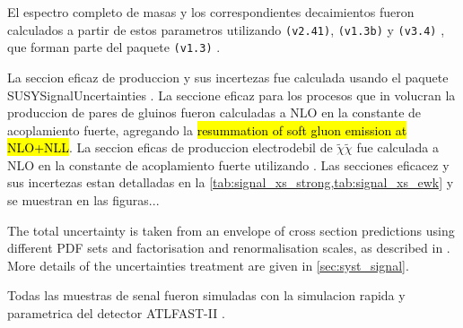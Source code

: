 El espectro completo de masas y los correspondientes decaimientos fueron calculados a partir
de estos parametros utilizando {\suspect} \texttt{(v2.41)}\cite{Djouadi2007426}, {\sdecay} \texttt{(v1.3b)} \cite{Muhlleitner:2004mka}
y {\hdecay} \texttt{(v3.4)} \cite{Djouadi:1997yw}, que forman parte del paquete {\susyhit} \texttt{(v1.3)} \cite{Djouadi:2006bz}.

La seccion eficaz de produccion y sus incertezas fue calculada usando el paquete SUSYSignalUncertainties \cite{SUSYsigunc}.
La seccione eficaz para los procesos que in volucran la produccion de pares de gluinos fueron calculadas a NLO
en la constante de acoplamiento fuerte, agregando la \hl{resummation of soft gluon emission at NLO+NLL}\cite{Beenakker:1996ch,Kulesza:2008jb,Kulesza:2009kq,Beenakker:2009ha,Beenakker:2011fu}.
La seccion eficas de produccion electrodebil de $\tilde{\chi}\tilde{\chi}$ fue calculada
a NLO en la constante de acoplamiento fuerte utilizando {\prospino} \cite{Beenakker:1999xh}.
Las secciones eficacez y sus incertezas estan detalladas en la \cref{tab:signal_xs_strong,tab:signal_xs_ewk}
y se muestran en las figuras...

The total uncertainty is taken from an envelope of cross section predictions using different PDF
sets and factorisation and renormalisation scales, as described in \cite{Kramer:2012bx}.
More details of the uncertainties treatment are given in {\Sec} \ref{sec:syst_signal}. %


Todas las muestras de senal fueron simuladas con la simulacion rapida y parametrica del detector ATLFAST-II \cite{Richter-Was:683751}.


